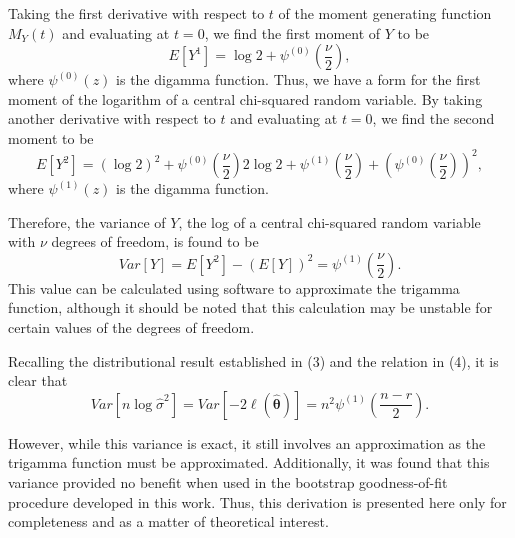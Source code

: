 \documentclass[review]{elsarticle}
\begin{document}
Taking the first derivative with respect to $t$ of the moment generating function $M_Y (t)$ and evaluating at $t=0$, we find the first moment of $Y$ to be
\begin{equation*}
	E \left[ Y^1 \right] =  \log 2 + \psi^{(0)} \left( \frac{\nu}{2} \right) ,
\end{equation*}
where $\psi^{(0)}(z)$ is the digamma function. Thus, we have a form for the first moment of the logarithm of a central chi-squared random variable. By taking another
derivative with respect to $t$ and evaluating at $t=0$, we find the second moment to be
\begin{equation*}
	E \left[ Y^2 \right] =
	(\log 2)^2 + \psi^{(0)} \left( \frac{\nu}{2} \right) 2 \log 2  + \psi^{(1)} \left( \frac{\nu}{2} \right) + \left( \psi^{(0)} \left( \frac{\nu}{2} \right) \right)^2 ,
\end{equation*}
where $\psi^{(1)}(z)$ is the digamma function.

Therefore, the variance of $Y$, the log of a central chi-squared random variable with
$\nu$ degrees of freedom, is found to be
\begin{equation*}
	Var \left[ Y \right] = E \left[ Y^2 \right] - \left( E \left[ Y \right] \right)^2 = \psi^{(1)} \left( \frac{\nu}{2} \right) .
\end{equation*}
This value can be calculated using software to approximate the trigamma function, although it should be noted that this calculation may be unstable for certain values of the degrees of freedom.

Recalling the distributional result established in (3) and the relation in (4), it is clear that
\begin{equation*}
	Var \left[ n \log \hat{\sigma}^2 \right] = Var \left[ -2 \ell (\hat{\bm{\theta}} ) \right] = n^2 \psi^{(1)} \left( \frac{n-r}{2} \right).
\end{equation*}

However, while this variance is exact, it still involves an approximation as the trigamma function must be approximated. Additionally, it was found that
this variance provided no benefit when used in the bootstrap goodness-of-fit procedure developed in this work. Thus, this derivation is presented here only
for completeness and as a matter of theoretical interest.


%

\end{document}
